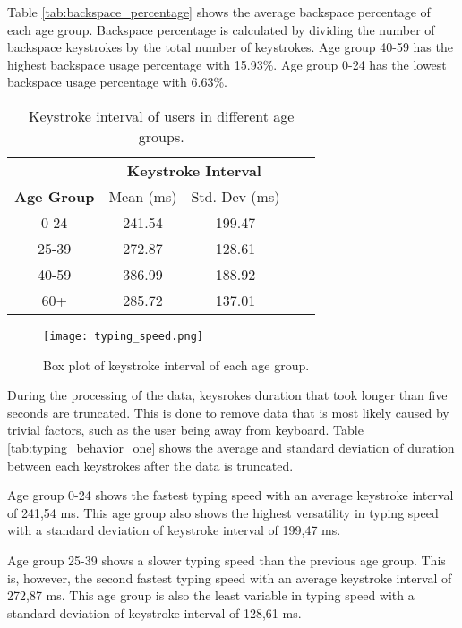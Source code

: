 Table \ref{tab:backspace_percentage} shows the average backspace percentage of each age group.
Backspace percentage is calculated by dividing the number of backspace keystrokes by the total number of keystrokes.
Age group 40-59 has the highest backspace usage percentage with 15.93\%.
Age group 0-24 has the lowest backspace usage percentage with 6.63\%.


\begin{table}[h]
    \centering
    \begin{tabular}{ccccc}
    \toprule
    \multicolumn{1}{c}{} & \multicolumn{2}{c}{\textbf{Keystroke Interval}}\\
    \cmidrule(rl){2-3} \cmidrule(rl){4-5}
    \textbf{Age Group} & {Mean (ms)} & {Std. Dev (ms)} \\
    \midrule
    0-24 & 241.54 & 199.47 \\
    25-39 & 272.87 & 128.61  \\
    40-59 & 386.99 & 188.92 \\
    60+ & 285.72 & 137.01 \\
    \bottomrule
    \end{tabular}
    \caption{Keystroke interval of users in different age groups.}
    \label{tab:typing_behavior}
\end{table}

\begin{figure}[h!]
    \centering
    \texttt{[image: typing\_speed.png]}
    \caption{Box plot of keystroke interval of each age group.}
    \label{box_plot_typing_speed}
\end{figure}

During the processing of the data, keysrokes duration that took longer than five seconds are truncated.
This is done to remove data that is most likely caused by trivial factors, such as the user being away from keyboard.
Table \ref{tab:typing_behavior_one} shows the average and standard deviation of duration between each keystrokes after the data is truncated.

Age group 0-24 shows the fastest typing speed with an average keystroke interval of 241,54 ms.
This age group also shows the highest versatility in typing speed with a standard deviation of keystroke interval of 199,47 ms.

Age group 25-39 shows a slower typing speed than the previous age group.
This is, however, the second fastest typing speed with an average keystroke interval of 272,87 ms.
This age group is also the least variable in typing speed with a standard deviation of keystroke interval of 128,61 ms.

